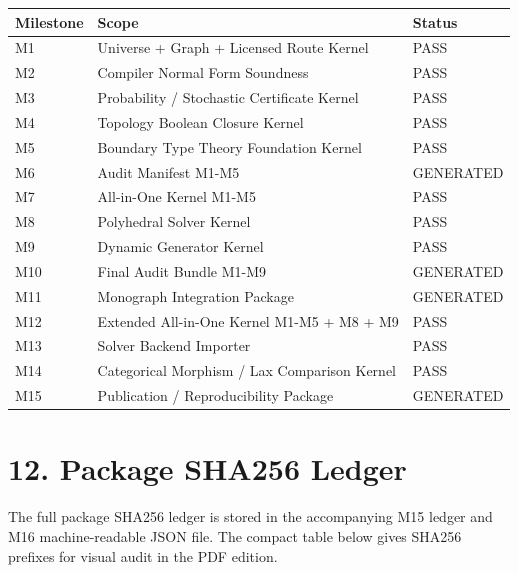 \documentclass[
  11pt,
]{article}
\begin{document}
\begin{longtable}[]{@{}lll@{}}
\toprule\noalign{}
Milestone & Scope & Status \\
\midrule\noalign{}
\endhead
\bottomrule\noalign{}
\endlastfoot
M1 & Universe + Graph + Licensed Route Kernel & PASS \\
M2 & Compiler Normal Form Soundness & PASS \\
M3 & Probability / Stochastic Certificate Kernel & PASS \\
M4 & Topology Boolean Closure Kernel & PASS \\
M5 & Boundary Type Theory Foundation Kernel & PASS \\
M6 & Audit Manifest M1-M5 & GENERATED \\
M7 & All-in-One Kernel M1-M5 & PASS \\
M8 & Polyhedral Solver Kernel & PASS \\
M9 & Dynamic Generator Kernel & PASS \\
M10 & Final Audit Bundle M1-M9 & GENERATED \\
M11 & Monograph Integration Package & GENERATED \\
M12 & Extended All-in-One Kernel M1-M5 + M8 + M9 & PASS \\
M13 & Solver Backend Importer & PASS \\
M14 & Categorical Morphism / Lax Comparison Kernel & PASS \\
M15 & Publication / Reproducibility Package & GENERATED \\
\end{longtable}

\section{12. Package SHA256 Ledger}\label{package-sha256-ledger}

The full package SHA256 ledger is stored in the accompanying M15 ledger
and M16 machine-readable JSON file. The compact table below gives SHA256
prefixes for visual audit in the PDF edition.
\end{document}
